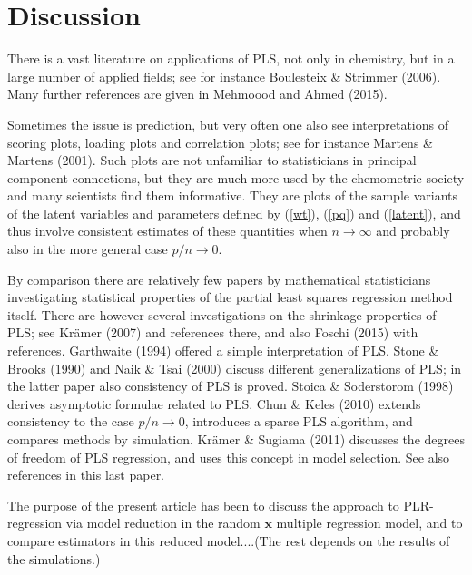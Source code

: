 \documentclass[a4paper, 11pt]{article}
\begin{document}
\section{Discussion}

There is a vast literature on applications of PLS, not only in chemistry, but in
a large number of applied fields; see for instance Boulesteix \& Strimmer
(2006). Many further references are given in \citet{mehmood2016diversity}
Mehmoood and Ahmed (2015).

Sometimes the issue is prediction, but very often one also see interpretations of scoring plots, loading plots and correlation plots; see for instance Martens \& Martens (2001). Such plots are not unfamiliar to statisticians in principal component connections, but they are much more used by the chemometric society and many scientists find them informative. They are plots of the sample variants of the latent variables and parameters defined by (\ref{wt}), (\ref{pq}) and (\ref{latent}), and thus involve consistent estimates of these quantities when $n\rightarrow\infty$ and probably also in the more general case $p/n\rightarrow 0$.

By comparison there are relatively few papers by mathematical statisticians investigating statistical properties of the partial least squares regression method itself. There are however several investigations on the shrinkage properties of PLS; see Kr\"{a}mer (2007) and references there, and also Foschi (2015) with references. Garthwaite (1994) offered a simple interpretation of PLS. Stone \& Brooks (1990) and Naik \& Tsai (2000)  discuss different generalizations of PLS; in the latter paper also consistency of PLS is proved. Stoica \& Soderstorom (1998) derives asymptotic formulae related to PLS. Chun \& Keles (2010) extends consistency to the case $p/n\rightarrow 0$, introduces a sparse PLS algorithm, and compares methods by simulation.  Kr\"{a}mer \& Sugiama (2011) discusses the degrees of freedom of PLS regression, and uses this concept in model selection. See also references in this last paper.

The purpose of the present article has been to discuss the approach to PLR-regression via model reduction in the random $\bm{x}$ multiple regression model, and to compare estimators in this reduced model....(The rest depends on the results of the simulations.)



\end{document}
